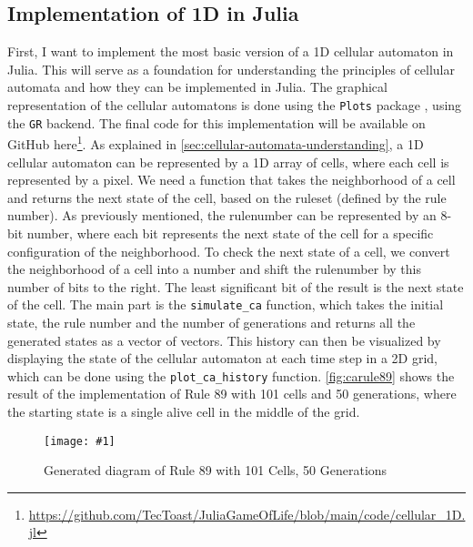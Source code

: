 \documentclass[a4paper,12pt]{llncs}
\numberwithin{equation}{section}
\newcommand{\imagewithwidth}[5]{
  \begin{figure}[htbp]%
    \begin{center}%
      \texttt{[image: \#1]}%
      \caption[#5]{#4}%
      \label{#3}%
    \end{center}%
  \end{figure}
}
\begin{document}
\subsection{Implementation of 1D in Julia}
First, I want to implement the most basic version of a 1D cellular automaton in Julia.
This will serve as a foundation for understanding the principles of cellular automata and how they can be implemented in Julia.
The graphical representation of the cellular automatons is done using the \texttt{Plots} package \cite{JuliaPlots}, using the \texttt{GR} \cite{JuliaGR,GR} backend.
The final code for this implementation will be available on GitHub here\footnote{\url{https://github.com/TecToast/JuliaGameOfLife/blob/main/code/cellular_1D.jl}}.
As explained in \autoref{sec:cellular-automata-understanding}, a 1D cellular automaton can be represented by a 1D array of cells, where each cell is represented by a pixel.
We need a function that takes the neighborhood of a cell and returns the next state of the cell, based on the ruleset (defined by the rule number).
As previously mentioned, the rulenumber can be represented by an 8-bit number, where each bit represents the next state of the cell for a specific configuration of the neighborhood.
To check the next state of a cell, we convert the neighborhood of a cell into a number and shift the rulenumber by this number of bits to the right. The least significant bit of the result is the next state of the cell.
The main part is the \texttt{simulate\_ca} function, which takes the initial state, the rule number and the number of generations and returns all the generated states as a vector of vectors.
This history can then be visualized by displaying the state of the cellular automaton at each time step in a 2D grid, which can be done using the \texttt{plot\_ca\_history} function.
\autoref{fig:carule89} shows the result of the implementation of Rule 89 with 101 cells and 50 generations, where the starting state is a single alive cell in the middle of the grid.
\imagewithwidth{figures/carule89}{0.9\textwidth}{fig:carule89}{Generated diagram of Rule 89 with 101 Cells, 50 Generations}{}
\end{document}
